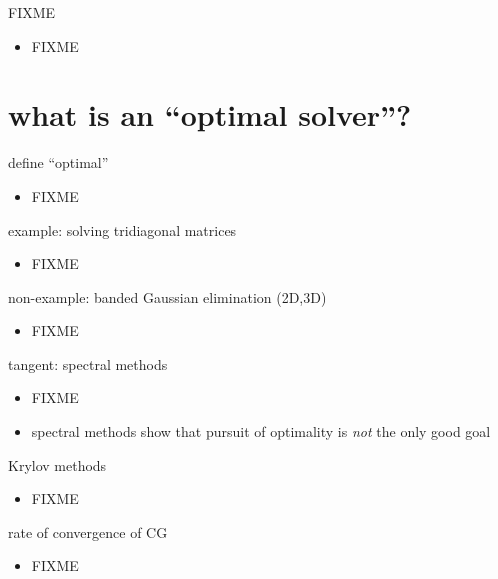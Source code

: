 \documentclass[hide notes,intlimits,usenames,dvipsnames]{beamer}
\begin{document}
\begin{frame}{FIXME}
\begin{itemize}
\item FIXME
\end{itemize}
\end{frame}


\section{what is an ``optimal solver''?}

\begin{frame}{define ``optimal''}
\begin{itemize}
\item FIXME
\end{itemize}
\end{frame}

\begin{frame}{example: solving tridiagonal matrices}
\begin{itemize}
\item FIXME
\end{itemize}
\end{frame}

\begin{frame}{non-example:  banded Gaussian elimination (2D,3D)}
\begin{itemize}
\item FIXME
\end{itemize}
\end{frame}

\begin{frame}{tangent: spectral methods}
\begin{itemize}
\item FIXME
\item spectral methods show that pursuit of optimality is \emph{not} the only good goal
\end{itemize}
\end{frame}

\begin{frame}{Krylov methods}
\begin{itemize}
\item FIXME
\end{itemize}
\end{frame}

\begin{frame}{rate of convergence of CG}
\begin{itemize}
\item FIXME
\end{itemize}
\end{frame}
\end{document}
